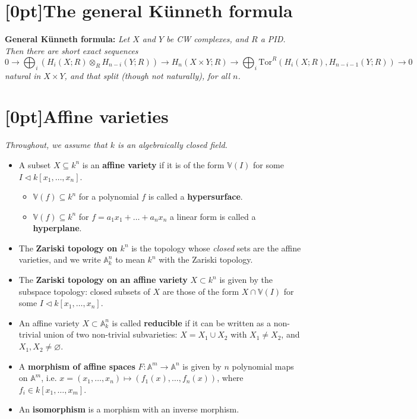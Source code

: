 \documentclass[10pt]{article}
\newcommand{\Tor}{\mathrm{Tor}}
\newcommand{\van}{\mathbb{V}}
\newcommand{\aff}{\mathbb{A}}
\newcommand{\kon}{{k[x_1,\ldots,x_n]}}
\newcommand{\kom}{{k[x_1,\ldots,x_m]}}
\newcommand{\AT}{\textcolor{violet}{AT}}
\newcommand{\AG}{\textcolor{green}{AG}}
\begin{document}

    \section{\protect\marginnote{\AT}[0pt]The general Künneth formula}

        \textbf{General Künneth formula:} \emph{Let $X$ and $Y$ be CW complexes, and $R$ a \emph{PID}.}
        \emph{Then there are short exact sequences}
            \begin{equation*}
                0\to\bigoplus_i(H_i(X;R)\otimes_R H_{n-i}(Y;R))\to H_n(X\times Y;R)\to\bigoplus_i\Tor^R(H_i(X;R),H_{n-i-1}(Y;R))\to0
            \end{equation*}
        \emph{natural in $X\times Y$, and that split (though not naturally), for all $n$.}


    \clearpage

    \section{\protect\marginnote{\AG}[0pt]Affine varieties}

        \emph{Throughout, we assume that $k$ is an algebraically closed field.}

        \begin{itemize}
            \item A subset $X\subseteq k^n$ is an \textbf{affine variety} if it is of the form $\van(I)$ for some $I\triangleleft k[x_1,\ldots,x_n]$.
            \begin{itemize}
                \item $\van(f)\subseteq k^n$ for a polynomial $f$ is called a \textbf{hypersurface}.
                \item $\van(f)\subseteq k^n$ for $f=a_1x_1+\ldots+a_nx_n$ a linear form is called a \textbf{hyperplane}.
            \end{itemize}
            \item The \textbf{Zariski topology on $k^n$} is the topology whose \emph{closed} sets are the affine varieties, and we write $\aff_k^n$ to mean $k^n$ with the Zariski topology.
            \item The \textbf{Zariski topology on an affine variety} $X\subset k^n$ is given by the subspace topology: closed subsets of $X$ are those of the form $X\cap\van(I)$ for some $I\triangleleft\kon$.
            \item An affine variety $X\subset\aff_k^n$ is called \textbf{reducible} if it can be written as a non-trivial union of two non-trivial subvarieties: $X=X_1\cup X_2$ with $X_1\neq X_2$, and $X_1,X_2\neq\varnothing$.
            \item A \textbf{morphism of affine spaces} $F\colon\aff^m\to\aff^n$ is given by $n$ polynomial maps on $\aff^m$, i.e. $x=(x_1,\ldots,x_n)\mapsto(f_1(x),\ldots,f_n(x))$, where $f_i\in\kom$.
            \item An \textbf{isomorphism} is a morphism with an inverse morphism.
        \end{itemize}
\end{document}

